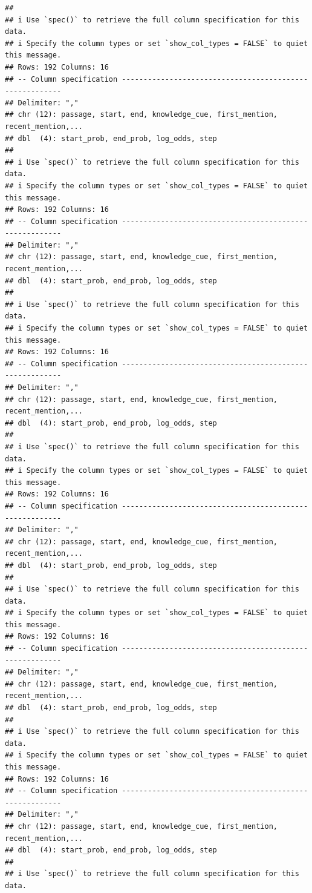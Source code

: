 \documentclass[
]{article}
\begin{document}
\begin{verbatim}
## 
## i Use `spec()` to retrieve the full column specification for this data.
## i Specify the column types or set `show_col_types = FALSE` to quiet this message.
## Rows: 192 Columns: 16
## -- Column specification --------------------------------------------------------
## Delimiter: ","
## chr (12): passage, start, end, knowledge_cue, first_mention, recent_mention,...
## dbl  (4): start_prob, end_prob, log_odds, step
## 
## i Use `spec()` to retrieve the full column specification for this data.
## i Specify the column types or set `show_col_types = FALSE` to quiet this message.
## Rows: 192 Columns: 16
## -- Column specification --------------------------------------------------------
## Delimiter: ","
## chr (12): passage, start, end, knowledge_cue, first_mention, recent_mention,...
## dbl  (4): start_prob, end_prob, log_odds, step
## 
## i Use `spec()` to retrieve the full column specification for this data.
## i Specify the column types or set `show_col_types = FALSE` to quiet this message.
## Rows: 192 Columns: 16
## -- Column specification --------------------------------------------------------
## Delimiter: ","
## chr (12): passage, start, end, knowledge_cue, first_mention, recent_mention,...
## dbl  (4): start_prob, end_prob, log_odds, step
## 
## i Use `spec()` to retrieve the full column specification for this data.
## i Specify the column types or set `show_col_types = FALSE` to quiet this message.
## Rows: 192 Columns: 16
## -- Column specification --------------------------------------------------------
## Delimiter: ","
## chr (12): passage, start, end, knowledge_cue, first_mention, recent_mention,...
## dbl  (4): start_prob, end_prob, log_odds, step
## 
## i Use `spec()` to retrieve the full column specification for this data.
## i Specify the column types or set `show_col_types = FALSE` to quiet this message.
## Rows: 192 Columns: 16
## -- Column specification --------------------------------------------------------
## Delimiter: ","
## chr (12): passage, start, end, knowledge_cue, first_mention, recent_mention,...
## dbl  (4): start_prob, end_prob, log_odds, step
## 
## i Use `spec()` to retrieve the full column specification for this data.
## i Specify the column types or set `show_col_types = FALSE` to quiet this message.
## Rows: 192 Columns: 16
## -- Column specification --------------------------------------------------------
## Delimiter: ","
## chr (12): passage, start, end, knowledge_cue, first_mention, recent_mention,...
## dbl  (4): start_prob, end_prob, log_odds, step
## 
## i Use `spec()` to retrieve the full column specification for this data.

\end{verbatim}
\end{document}
